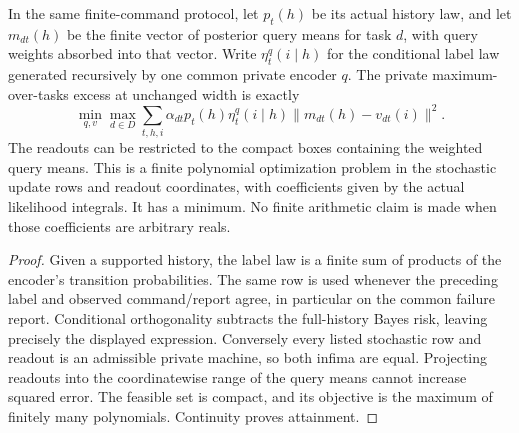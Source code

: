 \begin{proposition}
\label{prop:v9-a1-private}
In the same finite-command protocol, let $p_t(h)$ be its actual history
law, and let $m_{dt}(h)$ be the finite vector of posterior query means
for task $d$, with query weights absorbed into that vector. Write
$\eta_t^q(i\mid h)$ for the conditional label law generated recursively
by one common private encoder $q$. The private maximum-over-tasks excess
at unchanged width is exactly
\begin{equation}
 \min_{q,v}\max_{d\in D}
 \sum_{t,h,i}\alpha_{dt}p_t(h)\eta_t^q(i\mid h)
                           \|m_{dt}(h)-v_{dt}(i)\|^2.
 \label{eq:v9-a1-private}
\end{equation}
The readouts can be restricted to the compact boxes containing the
weighted query means. This is a finite polynomial optimization problem
in the stochastic update rows and readout coordinates, with coefficients
given by the actual likelihood integrals. It has a minimum. No finite
arithmetic claim is made when those coefficients are arbitrary reals.
\end{proposition}
\begin{proof}
Given a supported history, the label law is a finite sum of products of
the encoder's transition probabilities. The same row is used whenever
the preceding label and observed command/report agree, in particular on
the common failure report. Conditional orthogonality subtracts the
full-history Bayes risk, leaving precisely the displayed expression.
Conversely every listed stochastic row and readout is an admissible
private machine, so both infima are equal. Projecting readouts into the
coordinatewise range of the query means cannot increase squared error.
The feasible set is compact, and its objective is the maximum of finitely
many polynomials. Continuity proves attainment.
\end{proof}

